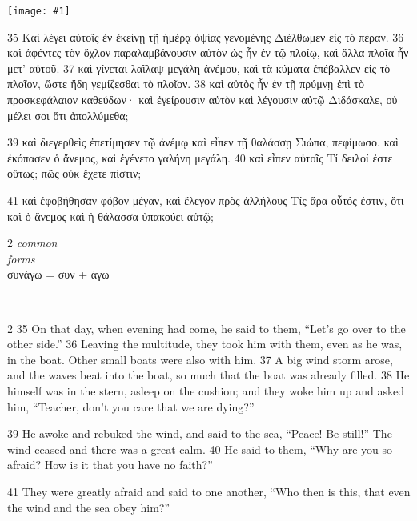 \documentclass[10pt,a5paper,twoside,twocolumn]{book}
\newcommand{\fig}[1]{\texttt{[image: \#1]}\label{fig:#1}}
\newcommand*\cleartoleftpage{%
  \ifodd\value{page}\hbox{}\clearpage\fi
}
\newcommand{\separator}{
  \vspace{-0.5\baselineskip}%
  \hspace{0.27\textwidth}%
  \noindent\makebox[\linewidth]{\resizebox{0.3333\linewidth}{1pt}{$\bullet$}}\bigskip%
  \vspace{-0.5\baselineskip}
}
\newenvironment{facing}{\cleartoleftpage}{\clearpage\pagebreak}
\newenvironment{help}{\clearpage}{}
\newenvironment{helpsec}{\begin{minipage}[t]{\textwidth}\begin{multicols}{2}}{\end{multicols}\end{minipage}}
\newenvironment{vocab}{\begin{helpsec}}{\end{helpsec}}
\newenvironment{translation}{\separator\\\begin{helpsec}\footnotesize}{\end{helpsec}}
\begin{document}

\begin{facing}

\fig{04-39} %

	35 Καὶ λέγει αὐτοῖς ἐν ἐκείνῃ τῇ ἡμέρᾳ ὀψίας γενομένης Διέλθωμεν εἰς τὸ πέραν. 36 καὶ ἀφέντες τὸν ὄχλον παραλαμβάνουσιν αὐτὸν ὡς ἦν ἐν τῷ πλοίῳ, καὶ ἄλλα πλοῖα ἦν μετ’ αὐτοῦ. 37 καὶ γίνεται λαῖλαψ μεγάλη ἀνέμου, καὶ τὰ κύματα ἐπέβαλλεν εἰς τὸ πλοῖον, ὥστε ἤδη γεμίζεσθαι τὸ πλοῖον. 38 καὶ αὐτὸς ἦν ἐν τῇ πρύμνῃ ἐπὶ τὸ προσκεφάλαιον καθεύδων· καὶ ἐγείρουσιν αὐτὸν καὶ λέγουσιν αὐτῷ Διδάσκαλε, οὐ μέλει σοι ὅτι ἀπολλύμεθα; 

39 καὶ διεγερθεὶς ἐπετίμησεν τῷ ἀνέμῳ καὶ εἶπεν τῇ θαλάσσῃ Σιώπα, πεφίμωσο. καὶ ἐκόπασεν ὁ ἄνεμος, καὶ ἐγένετο γαλήνη μεγάλη. 40 καὶ εἶπεν αὐτοῖς Τί δειλοί ἐστε οὕτως; πῶς οὐκ ἔχετε πίστιν; 

41 καὶ ἐφοβήθησαν φόβον μέγαν, καὶ ἔλεγον πρὸς ἀλλήλους Τίς ἄρα οὗτός ἐστιν, ὅτι καὶ ὁ ἄνεμος καὶ ἡ θάλασσα ὑπακούει αὐτῷ;


\begin{help}
\begin{vocab}
\emph{common}\\

\emph{forms}\\
συνάγω = συν + άγω \\
\end{vocab}
\begin{translation}
35 On that day, when evening had come, he said to them, ``Let's go over to the other side.'' 36 Leaving the multitude, they took him with them, even as he was, in the boat. Other small boats were also with him. 37 A big wind storm arose, and the waves beat into the boat, so much that the boat was already filled. 38 He himself was in the stern, asleep on the cushion; and they woke him up and asked him, ``Teacher, don't you care that we are dying?''

39 He awoke and rebuked the wind, and said to the sea, ``Peace! Be still!'' The wind ceased and there was a great calm. 40 He said to them, ``Why are you so afraid? How is it that you have no faith?''

41 They were greatly afraid and said to one another, ``Who then is this, that even the wind and the sea obey him?'' 

\end{translation}
\end{help}
\end{facing}
\end{document}
